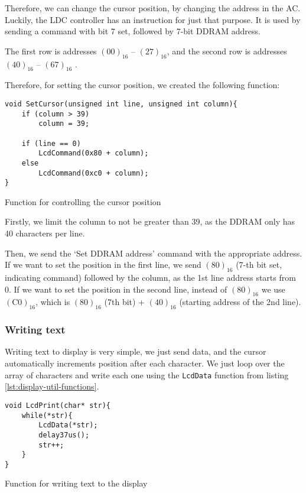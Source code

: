\documentclass[10pt]{article}
\begin{document}
Therefore, we can change the cursor position, by changing the address in the AC.
Luckily, the LDC controller has an instruction for just that purpose.
It is used by sending a command with bit 7 set, followed by 7-bit DDRAM address.

The first row is addresses $(00)_{16}$ -- $(27)_{16}$, and the second row is addresses $(40)_{16}$ -- $(67)_{16}$ \cite[p.11]{display-man}.

Therefore, for setting the cursor position, we created the following function:
\begin{program}[H]
	\begin{lstlisting}
void SetCursor(unsigned int line, unsigned int column){
    if (column > 39)
        column = 39;

    if (line == 0)
        LcdCommand(0x80 + column);
    else 
        LcdCommand(0xc0 + column);
}
	\end{lstlisting}
	\caption{Function for controlling the cursor position}
\end{program}

Firstly, we limit the column to not be greater than 39, as the DDRAM only has 40 characters per line.

Then, we send the `Set DDRAM address' command with the appropriate address.
If we want to set the position in the first line, we send $(80)_{16}$ (7-th bit set, indicating command) followed by the column, as the 1st line address starts from 0.
If we want to set the position in the second line, instead of $(80)_{16}$ we use $(\mathrm{C0})_{16}$, which is $(80)_{16}$ (7th bit) + $(40)_{16}$ (starting address of the 2nd line).

\subsubsection{Writing text}

Writing text to display is very simple, we just send data, and the cursor automatically increments position after each character.
We just loop over the array of characters and write each one using the \texttt{LcdData} function from listing \ref{lst:display-util-functions}.

\begin{program}[H]
	\begin{lstlisting}
void LcdPrint(char* str){
    while(*str){
        LcdData(*str);
        delay37us();
        str++;
    }
}
	\end{lstlisting}
	\caption{Function for writing text to the display}
\end{program}
    
\end{document}
